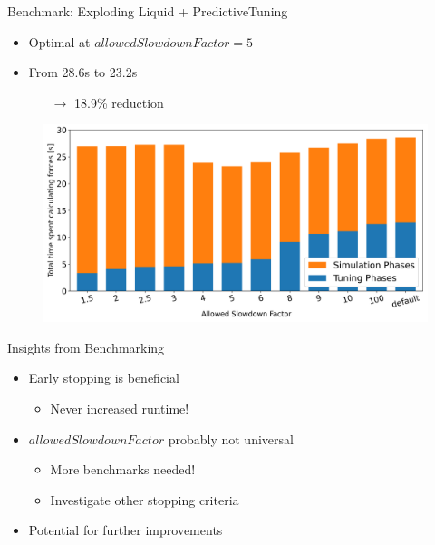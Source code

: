 \documentclass[
	10pt,
	t		%
]{beamer}
\begin{document}
\begin{frame}{Benchmark: Exploding Liquid + PredictiveTuning}

    \begin{itemize}
        \item Optimal at $allowedSlowdownFactor = 5$
        \item From 28.6s to 23.2s
              \begin{itemize}
                  \item[$\rightarrow$] 18.9\% reduction
              \end{itemize}
    \end{itemize}


    \begin{figure}[H]
        \centering

        \includegraphics[width=0.92\columnwidth]{../../data/explodingLiquid/cluster/predictiveTuning/analytics/total_time_average_full_scale.png}


    \end{figure}

\end{frame}


\begin{frame}{Insights from Benchmarking}

    \begin{itemize}
        \item Early stopping is beneficial
              \begin{itemize}
                  \item Never increased runtime!
              \end{itemize}
        \item $allowedSlowdownFactor$ probably not universal
              \begin{itemize}
                  \item More benchmarks needed!
                  \item Investigate other stopping criteria
              \end{itemize}
        \item Potential for further improvements
    \end{itemize}
\end{frame}
\end{document}
